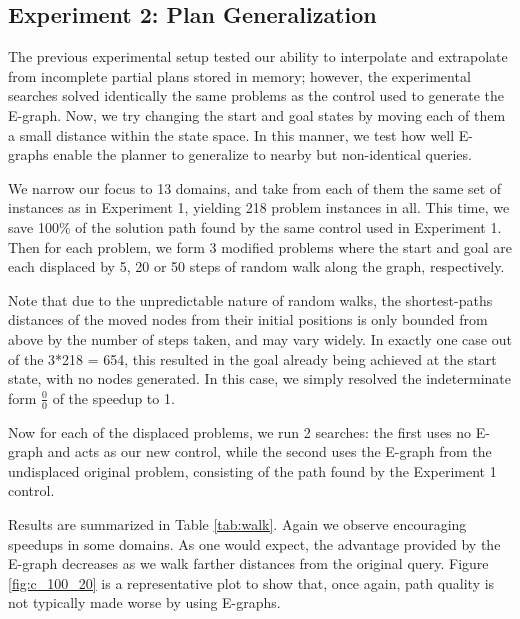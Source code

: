 \documentclass[letterpaper]{article}
\begin{document}
\subsection{Experiment 2: Plan Generalization}

The previous experimental setup tested our ability to interpolate and extrapolate from incomplete partial plans stored in memory; however, the experimental searches solved identically the same problems as the control used to generate the E-graph.
Now, we try changing the start and goal states by moving each of them a small distance within the state space. 
In this manner, we test how well E-graphs enable the planner to generalize to nearby but non-identical queries.

We narrow our focus to 13 domains, and take from each of them the same set of instances as in Experiment 1, yielding 218 problem instances in all.
This time, we save 100\% of the solution path found by the same control used in Experiment 1.
Then for each problem, we form 3 modified problems where the start and goal are each displaced by 5, 20 or 50 steps of random walk along the graph, respectively.

Note that due to the unpredictable nature of random walks, the shortest-paths distances of the moved nodes from their initial positions is only bounded from above by the number of steps taken, and may vary widely.
In exactly one case out of the 3*218 = 654, this resulted in the goal already being achieved at the start state, with no nodes generated. In this case, we simply resolved the indeterminate form $\frac 00$ of the speedup to 1.

Now for each of the displaced problems, we run 2 searches: the first uses no E-graph and acts as our new control, while the second uses the E-graph from the undisplaced original problem, consisting of the path found by the Experiment 1 control.

Results are summarized in Table \ref{tab:walk}.
Again we observe encouraging speedups in some domains. As one would expect, the advantage provided by the E-graph decreases as we walk farther distances from the original query. Figure \ref{fig:c_100_20} is a representative plot to show that, once again, path quality is not typically made worse by using E-graphs.
\end{document}
